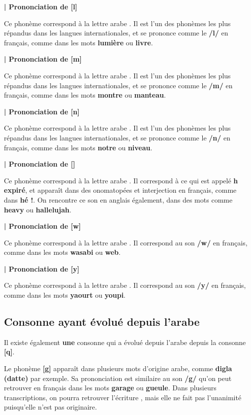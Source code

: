 \textbf{| Prononciation de   [l]}

Ce phonème correspond à la lettre arabe . Il est l'un des phonèmes les plus répandus dans les langues internationales, et se prononce comme le \textbf{/l/} en français, comme dans les mots \textbf{lumière} ou \textbf{livre}.


\textbf{| Prononciation de   [m]}

Ce phonème correspond à la lettre arabe . Il est l'un des phonèmes les plus répandus dans les langues internationales, et se prononce comme le \textbf{/m/} en français, comme dans les mots \textbf{montre} ou \textbf{manteau}.


\textbf{| Prononciation de   [n]}

Ce phonème correspond à la lettre arabe . Il est l'un des phonèmes les plus répandus dans les langues internationales, et se prononce comme le \textbf{/n/} en français, comme dans les mots \textbf{notre} ou \textbf{niveau}.


\textbf{| Prononciation de  [\texthth]}

Ce phonème correspond à la lettre arabe . Il correspond à ce qui est appelé \textbf{h expiré}, et apparaît dans des onomatopées et interjection en français, comme dans \textbf{hé !}. On rencontre ce son en anglais également, dans des mots comme \textbf{heavy} ou \textbf{hallelujah}.


\textbf{| Prononciation de  [w]}

Ce phonème correspond à la lettre arabe . Il correspond au son \textbf{/w/} en français, comme dans les mots \textbf{wasabi} ou \textbf{web}.


\textbf{| Prononciation de  [y]}

Ce phonème correspond à la lettre arabe . Il correspond au son \textbf{/y/} en français, comme dans les mots \textbf{yaourt} ou \textbf{youpi}.


\subsection{Consonne ayant évolué depuis l'arabe}

Il existe également \textbf{une} consonne qui a évolué depuis l'arabe depuis la consonne \textbf{ [q]}.

Le phonème \textbf{[g]} apparaît dans plusieurs mots d'origine arabe, comme \textbf{digla (datte)} par exemple. Sa prononciation est similaire au son \textbf{/g/} qu'on peut retrouver en français dans les mots \textbf{garage} ou \textbf{gueule}. Dans plusieurs transcriptions, on pourra retrouver l'écriture \textbf{}, mais elle ne fait pas l'unanimité puisqu'elle n'est pas originaire.

